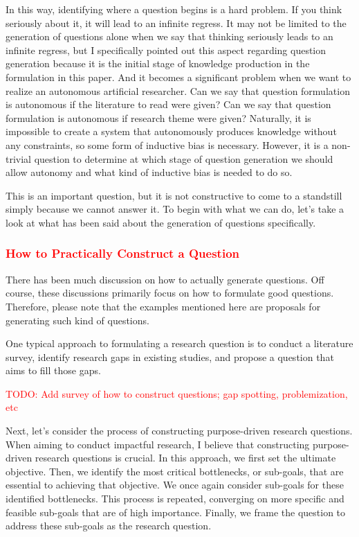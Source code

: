 \documentclass{book}
\begin{document}
In this way, identifying where a question begins is a hard problem. If you think seriously about it, it will lead to an infinite regress. It may not be limited to the generation of questions alone when we say that thinking seriously leads to an infinite regress, but I specifically pointed out this aspect regarding question generation because it is the initial stage of knowledge production in the formulation in this paper. And it becomes a significant problem when we want to realize an autonomous artificial researcher. Can we say that question formulation is autonomous if the literature to read were given? Can we say that question formulation is autonomous if research theme were given? Naturally, it is impossible to create a system that autonomously produces knowledge without any constraints, so some form of inductive bias is necessary. However, it is a non-trivial question to determine at which stage of question generation we should allow autonomy and what kind of inductive bias is needed to do so. 

This is an important question, but it is not constructive to come to a standstill simply because we cannot answer it. To begin with what we can do, let's take a look at what has been said about the generation of questions specifically.

\subsubsection{\textcolor{red}{How to Practically Construct a Question}}

There has been much discussion on how to actually generate questions. Off course, these discussions primarily focus on how to formulate good questions. Therefore, please note that the examples mentioned here are proposals for generating such kind of questions.

One typical approach to formulating a research question is to conduct a literature survey, identify research gaps in existing studies, and propose a question that aims to fill those gaps.

\textcolor{red}{TODO: Add survey of how to construct questions; gap spotting, problemization, etc}

Next, let's consider the process of constructing purpose-driven research questions. When aiming to conduct impactful research, I believe that constructing purpose-driven research questions is crucial. In this approach, we first set the ultimate objective. Then, we identify the most critical bottlenecks, or sub-goals, that are essential to achieving that objective. We once again consider sub-goals for these identified bottlenecks. This process is repeated, converging on more specific and feasible sub-goals that are of high importance. Finally, we frame the question to address these sub-goals as the research question. 
\end{document}

